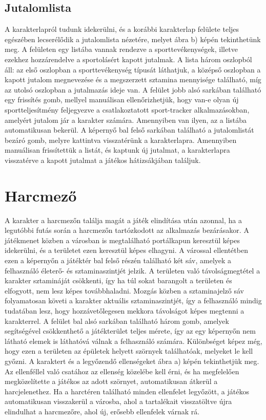 \subsection*{Jutalomlista}
\label{jutalomlista}
A karakterlapról tudunk idekerülni, és a korábbi karakterlap felülete teljes egészében lecserélődik a jutalomlista nézetére, melyet  ábra b) képén tekinthetünk meg. 
A felületen egy listába vannak rendezve a sporttevékenységek, illetve ezekhez hozzárendelve a sportolásért kapott jutalmak. 
A lista három oszlopból áll: az első oszlopban a sporttevékenység típusát láthatjuk, a középső oszlopban a kapott jutalom megnevezése és a megszerzett sztamina mennyisége található, míg az utolsó oszlopban a jutalmazás ideje van. 
A felület jobb alsó sarkában található egy frissítés gomb, mellyel manuálisan ellenőrizhetjük, hogy van-e olyan új sportteljesítmény feljegyezve a csatlakoztatott sport-tracker alkalmazásokban, amelyért jutalom jár a karakter számára. 
Amennyiben van ilyen, az a listába automatikusan bekerül.
A képernyő bal felső sarkában található a jutalomlistát bezáró gomb, melyre kattintva visszatérünk a karakterlapra. 
Amennyiben manuálisan frissítettük a listát, és kaptunk új jutalmat, a karakterlapra visszatérve a kapott jutalmat a játékos hátizsákjában találjuk. 

\section{Harcmező}
\label{harcmezo}
A karakter a harcmezőn találja magát a játék elindítása után azonnal, ha a legutóbbi futás során a harcmezőn tartózkodott az alkalmazás bezárásakor. 
A játékmenet közben a városban is megtalálható portálkapun keresztül képes idekerülni, és a területet ezen keresztül képes elhagyni. 
A várossal ellentétben ezen a képernyőn a játéktér bal felső részén található két sáv, amelyek a felhasználó életerő- és sztaminaszintjét jelzik. 
A területen való távolságmegtétel a karakter sztamináját csökkenti, így ha túl sokat barangolt a területen és elfogyott, nem lesz képes továbbhaladni. 
Mozgás közben a sztaminajelző sáv folyamatosan követi a karakter aktuális sztaminaszintjét, így a felhasználó mindig tudatában lesz, hogy hozzávetőlegesen mekkora távolságot képes megtenni a karakterrel. 
A felület bal alsó sarkában található három gomb, amelyek segítségével csökkenthető a játékterület teljes mérete, így az egy képernyőn nem látható elemek is láthatóvá válnak a felhasználó számára. 
Különbséget képez még, hogy ezen a területen az épületek helyett szörnyek találhatóak, melyeket le kell győzni. 
A karaktert és a legyőzendő ellenségeket  ábra a) képén tekinthetjük meg. 
Az ellenféllel való csatához az ellenség közelébe kell érni, és ha megfelelően megközelítette a játékos az adott szörnyet, automatikusan átkerül a harcjelenethez. 
Ha a harctéren található minden ellenfelet legyőzött, a játékos automatikusan visszakerül a városba, ahol a tartalékait visszatöltve újra elindulhat a harcmezőre, ahol új, erősebb ellenfelek várnak rá. 

